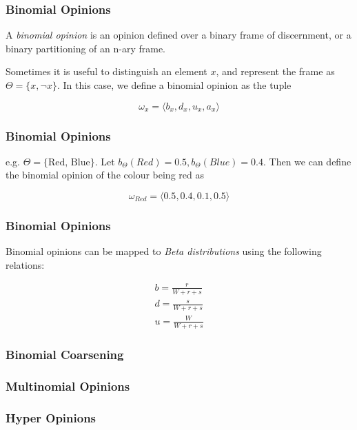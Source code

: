 \documentclass{beamer}
\begin{document}
\begin{frame}
\frametitle{Binomial Opinions}

A \emph{binomial opinion} is an opinion defined over a binary frame of discernment, or
a binary partitioning of an n-ary frame.

Sometimes it is useful to distinguish an element $x$, and represent the frame as
$\Theta = \lbrace x, \lnot x \rbrace$. In this case, we define a binomial opinion as
the tuple

$$
\omega_x = \langle b_x, d_x, u_x, a_x \rangle
$$

\end{frame}

\begin{frame}
\frametitle{Binomial Opinions}

e.g. $\Theta = \lbrace \mbox{Red, Blue} \rbrace$.
Let $b_\Theta\left(Red\right) = 0.5, b_\Theta\left(Blue\right) = 0.4$. Then we can
define the binomial opinion of the colour being red as

$$
\omega_{Red} = \langle 0.5, 0.4, 0.1, 0.5 \rangle
$$

\end{frame}

\begin{frame}
\frametitle{Binomial Opinions}

Binomial opinions can be mapped to \emph{Beta distributions} using the following relations:

$$
\begin{array}{l}
  b = \frac{r}{W + r + s} \\
  d = \frac{s}{W + r + s} \\
  u = \frac{W}{W + r + s}
\end{array}
$$

\end{frame}


\begin{frame}
\frametitle{Binomial Coarsening}

\end{frame}

\begin{frame}
\frametitle{Multinomial Opinions}

\end{frame}

\begin{frame}
\frametitle{Hyper Opinions}

\end{frame}
\end{document}
